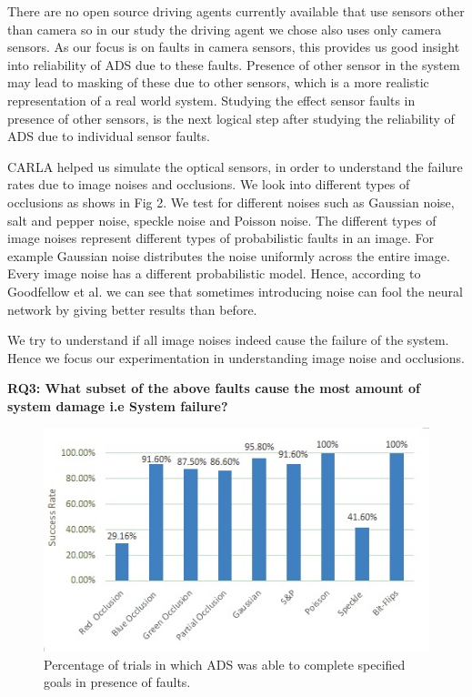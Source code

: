 There are no open source driving agents currently available that use sensors other than camera so in our study the driving agent we chose also uses only camera sensors. As our focus is on faults in camera sensors, this provides us good insight into reliability of ADS due to these faults. Presence of other sensor in the system may lead to masking of these due to other sensors, which is a more realistic representation of a real world system. Studying the effect sensor faults in presence of other sensors, is the next logical step after studying the reliability of ADS due to individual sensor faults.  

CARLA helped us simulate the optical sensors, in order to understand the failure rates due to image noises and occlusions. We look into different types of occlusions as shows in Fig 2. We test for different noises such as Gaussian noise, salt and pepper noise, speckle noise and Poisson noise. The different types of image noises represent different types of probabilistic faults in an image. For example Gaussian noise distributes the noise uniformly across the entire image. Every image noise has a different probabilistic model. Hence, according to Goodfellow et al.\cite{Goodfellow} we can see that sometimes introducing noise can fool the neural network by giving better results than before. 

We try to understand if all image noises indeed cause the failure of the system. Hence we focus our experimentation in understanding image noise and occlusions.

\textbf{RQ3: What subset of the above faults cause the most amount of system damage i.e System failure?}

\begin{figure}
	\vspace{-0.5em}
	\centering
	\includegraphics[scale=0.7]{success_rate}
	\vspace{-0.5em}
	\caption{Percentage of trials in which ADS was able to complete specified goals in presence of faults.}
	\label{fig:success_rate}
	\vspace{-1.5em}
\end{figure}

